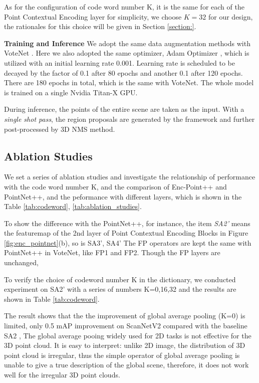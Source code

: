 \documentclass[runningheads]{llncs}
\begin{document}
As for the configuration of code word number K, it is the same for each of the Point Contextual Encoding layer for simplicity, we choose $K=32$ for our design, the rationales for this choice will be given in Section \ref{section:}.
 

\noindent\textbf{Training and Inference}
 We adopt the same data augmentation methods with VoteNet \cite{VoteNet} .  Here we also adopted the same optimizer, Adam Optimizer \cite{adam}, which  is utilized with an initial learning rate 0.001. Learning rate is scheduled to be decayed by the factor of 0.1 after 80 epochs and another 0.1 after 120 epochs. There are 180 epochs in total, which is the same with VoteNet\cite{VoteNet}. The whole model is trained on a single Nvidia Titan-X GPU.
 
During inference,  the points of the entire scene are taken as the input. With a \emph{single shot pass}, the region proposals are generated by the framework and further post-processed by 3D NMS method.

\subsection{Ablation Studies}
We set a  series of ablation studies and investigate the relationship of performance with the code word number K, and the comparison of Enc-Point++ and PointNet++,  and the peformance with different layers, which is shown in the Table \ref{tab:codeword}, \ref{tab:ablation_studies}. %


To show the difference with the PointNet++, for instance, the item \emph{SA2'} means the featuremap of the 2nd layer of  Point Contextual Encoding Blocks in Figure \ref{fig:enc_pointnet}(b), so is SA3', SA4'
The FP operators are kept the same with PointNet++ in VoteNet\cite{VoteNet}, like FP1 and FP2. Though the FP layers are unchanged, 


To verify the choice of codeword number K in the dictionary, we conducted experiment on SA2' with a series  of numbers K=0,16,32 and the results are shown in Table \ref{tab:codeword}.       

The result shows that the the improvement of global average pooling (K=0) is limited, only 0.5 mAP improvement on ScanNetV2 compared with the baseline SA2 , The  global average pooing widely used for 2D tasks is not effective for the 3D point cloud. It is easy to interpret: unlike 2D image, the distribution of 3D point cloud  is irregular, thus the simple operator of global average pooling is unable to give a true description of the global scene, therefore,  it does not work well for the irregular 3D point clouds.
\end{document}

